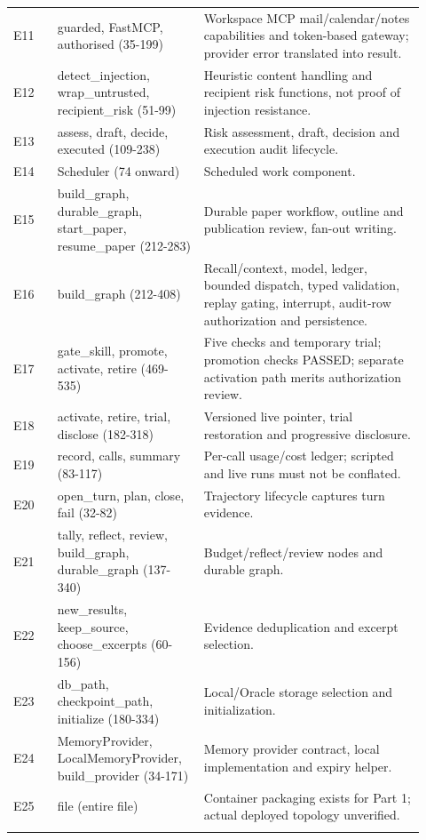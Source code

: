\documentclass[10pt,letterpaper]{article}
\begin{document}
\begin{longtable}{@{}>{\raggedright\arraybackslash}p{0.1\linewidth}>{\raggedright\arraybackslash}p{0.32\linewidth}>{\raggedright\arraybackslash}p{0.5\linewidth}@{}}
E11 & guarded, FastMCP, authorised (35-199) & Workspace MCP mail/calendar/notes capabilities and token-based gateway; provider error translated into result.\\\addlinespace
E12 & detect\_injection, wrap\_untrusted, recipient\_risk (51-99) & Heuristic content handling and recipient risk functions, not proof of injection resistance.\\\addlinespace
E13 & assess, draft, decide, executed (109-238) & Risk assessment, draft, decision and execution audit lifecycle.\\\addlinespace
E14 & Scheduler (74 onward) & Scheduled work component.\\\addlinespace
E15 & build\_graph, durable\_graph, start\_paper, resume\_paper (212-283) & Durable paper workflow, outline and publication review, fan-out writing.\\\addlinespace
E16 & build\_graph (212-408) & Recall/context, model, ledger, bounded dispatch, typed validation, replay gating, interrupt, audit-row authorization and persistence.\\\addlinespace
E17 & gate\_skill, promote, activate, retire (469-535) & Five checks and temporary trial; promotion checks PASSED; separate activation path merits authorization review.\\\addlinespace
E18 & activate, retire, trial, disclose (182-318) & Versioned live pointer, trial restoration and progressive disclosure.\\\addlinespace
E19 & record, calls, summary (83-117) & Per-call usage/cost ledger; scripted and live runs must not be conflated.\\\addlinespace
E20 & open\_turn, plan, close, fail (32-82) & Trajectory lifecycle captures turn evidence.\\\addlinespace
E21 & tally, reflect, review, build\_graph, durable\_graph (137-340) & Budget/reflect/review nodes and durable graph.\\\addlinespace
E22 & new\_results, keep\_source, choose\_excerpts (60-156) & Evidence deduplication and excerpt selection.\\\addlinespace
E23 & db\_path, checkpoint\_path, initialize (180-334) & Local/Oracle storage selection and initialization.\\\addlinespace
E24 & MemoryProvider, LocalMemoryProvider, build\_provider (34-171) & Memory provider contract, local implementation and expiry helper.\\\addlinespace
E25 & file (entire file) & Container packaging exists for Part 1; actual deployed topology unverified.\\\addlinespace

\end{longtable}
\end{document}
